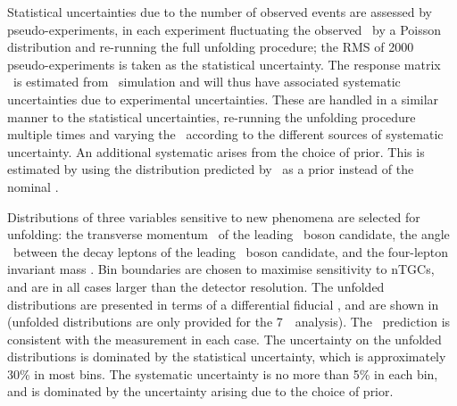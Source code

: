 Statistical uncertainties due to the number of observed events are assessed by
pseudo-experiments, in each experiment fluctuating the observed \unfy\ by a
Poisson distribution and re-running the full unfolding procedure; the RMS of 2000
pseudo-experiments is taken as the statistical uncertainty. 
The response matrix \unfA\ is estimated from \mc\ simulation and
will thus have associated systematic uncertainties due to experimental
uncertainties. These are handled in a similar manner to the statistical
uncertainties, re-running the unfolding procedure multiple times and varying the
\unfA\ according to the different sources of systematic uncertainty. An
additional systematic arises from the choice of prior. This is estimated by
using the distribution predicted by \sherpa\ as a prior instead of the nominal
\powhegbox. 

Distributions of three variables sensitive to new phenomena are selected for
unfolding: the transverse momentum \ptZ\ of the leading \Z\ boson candidate, the
angle \deltaPhiLL\ between the decay leptons
of the leading \Z\ boson candidate, and the four-lepton invariant mass \mZZ. Bin
boundaries are chosen to maximise sensitivity to nTGCs, and are in all cases
larger than the detector resolution. The unfolded distributions are presented in
terms of a differential fiducial \cx, and are shown
in~ (unfolded distributions are only provided for
the 7~\tev\ analysis). The \sm\ prediction is consistent with the
measurement in each case. The uncertainty on the unfolded distributions is dominated by the
statistical uncertainty, which is approximately 30\% in most bins. The
systematic uncertainty is no more than 5\% in each bin, and is dominated by the
uncertainty arising due to the choice of prior.

